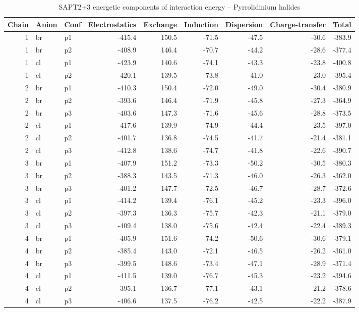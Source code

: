 \documentclass[a4paper]{article}
\begin{document}
\begin{table}[ht]
\centering
\footnotesize
\caption{SAPT2+3 energetic components of interaction energy -- Pyrrolidinium halides}
\begin{tabular}{rllrrrrrr}
  \hline
Chain & Anion & Conf & Electrostatics & Exchange & Induction & Dispersion & Charge-transfer & Total \\ 
  \hline
 1 & br & p1 & -415.4 & 150.5 & -71.5 & -47.5 & -30.6 & -383.9 \\ 
   1 & br & p2 & -408.9 & 146.4 & -70.7 & -44.2 & -28.6 & -377.4 \\ 
   1 & cl & p1 & -423.9 & 140.6 & -74.1 & -43.3 & -23.8 & -400.8 \\ 
   1 & cl & p2 & -420.1 & 139.5 & -73.8 & -41.0 & -23.0 & -395.4 \\ 
   2 & br & p1 & -410.3 & 150.4 & -72.0 & -49.0 & -30.4 & -380.9 \\ 
   2 & br & p2 & -393.6 & 146.4 & -71.9 & -45.8 & -27.3 & -364.9 \\ 
   2 & br & p3 & -403.6 & 147.3 & -71.6 & -45.6 & -28.8 & -373.5 \\ 
   2 & cl & p1 & -417.6 & 139.9 & -74.9 & -44.4 & -23.5 & -397.0 \\ 
   2 & cl & p2 & -401.7 & 136.8 & -74.5 & -41.7 & -21.4 & -381.1 \\ 
   2 & cl & p3 & -412.8 & 138.6 & -74.7 & -41.8 & -22.6 & -390.7 \\ 
   3 & br & p1 & -407.9 & 151.2 & -73.3 & -50.2 & -30.5 & -380.3 \\ 
   3 & br & p2 & -388.3 & 143.5 & -71.3 & -46.0 & -26.3 & -362.0 \\ 
   3 & br & p3 & -401.2 & 147.7 & -72.5 & -46.7 & -28.7 & -372.6 \\ 
   3 & cl & p1 & -414.2 & 139.4 & -76.1 & -45.2 & -23.3 & -396.0 \\ 
   3 & cl & p2 & -397.3 & 136.3 & -75.7 & -42.3 & -21.1 & -379.0 \\ 
   3 & cl & p3 & -409.4 & 138.0 & -75.6 & -42.4 & -22.4 & -389.3 \\ 
   4 & br & p1 & -405.9 & 151.6 & -74.2 & -50.6 & -30.6 & -379.1 \\ 
   4 & br & p2 & -385.4 & 143.0 & -72.1 & -46.5 & -26.2 & -361.0 \\ 
   4 & br & p3 & -399.5 & 148.6 & -73.4 & -47.1 & -28.9 & -371.4 \\ 
   4 & cl & p1 & -411.5 & 139.0 & -76.7 & -45.3 & -23.2 & -394.6 \\ 
   4 & cl & p2 & -395.1 & 136.7 & -77.1 & -43.1 & -21.2 & -378.6 \\ 
   4 & cl & p3 & -406.6 & 137.5 & -76.2 & -42.5 & -22.2 & -387.9 \\ 
   \hline
\end{tabular}
\end{table}
\end{document}
